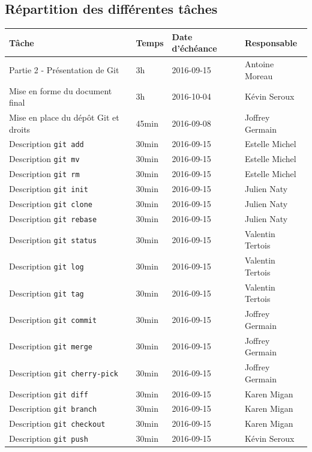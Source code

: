\documentclass[11pt,canadien]{article}
\begin{document}
{\begin{appendices}
\section{Répartition des différentes tâches}
\begin{tabular}{l l l l}
	\textbf{Tâche} & \textbf{Temps} & \textbf{Date d'échéance} & \textbf{Responsable}
	\\ \hline
	   Partie 2 - Présentation de Git       & 3h    & 2016-09-15 & Antoine Moreau
	\\ Mise en forme du document final      & 3h    & 2016-10-04 & Kévin Seroux
	\\ Mise en place du dépôt Git et droits & 45min & 2016-09-08 & Joffrey Germain
	\\ Description \texttt{git add}         & 30min & 2016-09-15 & Estelle Michel
	\\ Description \texttt{git mv}          & 30min & 2016-09-15 & Estelle Michel
	\\ Description \texttt{git rm}          & 30min & 2016-09-15 & Estelle Michel
	\\ Description \texttt{git init}        & 30min & 2016-09-15 & Julien Naty
	\\ Description \texttt{git clone}       & 30min & 2016-09-15 & Julien Naty
	\\ Description \texttt{git rebase}      & 30min & 2016-09-15 & Julien Naty
	\\ Description \texttt{git status}      & 30min & 2016-09-15 & Valentin Tertois
	\\ Description \texttt{git log}         & 30min & 2016-09-15 & Valentin Tertois
	\\ Description \texttt{git tag}         & 30min & 2016-09-15 & Valentin Tertois
	\\ Description \texttt{git commit}      & 30min & 2016-09-15 & Joffrey Germain
	\\ Description \texttt{git merge}       & 30min & 2016-09-15 & Joffrey Germain
	\\ Description \texttt{git cherry-pick} & 30min & 2016-09-15 & Joffrey Germain
	\\ Description \texttt{git diff}        & 30min & 2016-09-15 & Karen Migan
	\\ Description \texttt{git branch}      & 30min & 2016-09-15 & Karen Migan
	\\ Description \texttt{git checkout}    & 30min & 2016-09-15 & Karen Migan
	\\ Description \texttt{git push}        & 30min & 2016-09-15 & Kévin Seroux

\end{tabular}
\end{appendices}}
\end{document}

